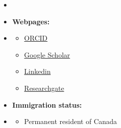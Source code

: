 \documentclass[12pt,oneside]{book}
\begin{document}
 \begin {itemize}
\item [] \phantom \quad  \item   []  {\bf  Webpages:} \vspace{-1.5em}
\item []  {\bf \hrulefill } \vspace{-1em}
\begin {itemize}
\item  \small \href{https://orcid.org/0000-0002-4116-0778 } {ORCID} 
\item \small \href{https://scholar.google.com/citations?user=bVzQEKkAAAAJ&hl=en&oi=ao  } { Google Scholar}
\item \small \href{https://www.linkedin.com/in/moslemheidarpur/   } {Linkedin}
\item \small \href{ https://www.researchgate.net/profile/Moslem-Heidarpur   } {Researchgate}
\end{itemize}  \vspace{0.5em}
\item  []  {\bf  Immigration status:}  \vspace{-1.5em}
\item []  {\bf \hrulefill } \vspace{-1em}
\begin {itemize} \item \small Permanent resident of Canada

\end{itemize}
\end{itemize}
\end{document}

